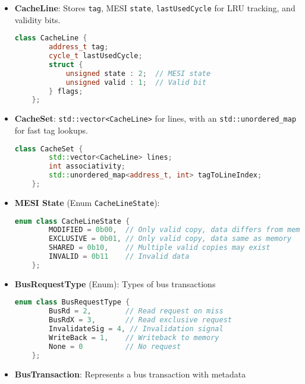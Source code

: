 \documentclass[11pt]{article}
\begin{document}
\begin{itemize}
    \item \textbf{CacheLine}: Stores \texttt{tag}, MESI \texttt{state}, \texttt{lastUsedCycle} for LRU tracking, and validity bits.
    
    \begin{lstlisting}[language=C++]
    class CacheLine {
        address_t tag;
        cycle_t lastUsedCycle;
        struct {
            unsigned state : 2;  // MESI state
            unsigned valid : 1;  // Valid bit
        } flags;
    };
    \end{lstlisting}
    
    \item \textbf{CacheSet}: \texttt{std::vector<CacheLine>} for lines, with an \texttt{std::unordered\_map} for fast tag lookups.
    
    \begin{lstlisting}[language=C++]
    class CacheSet {
        std::vector<CacheLine> lines;
        int associativity;
        std::unordered_map<address_t, int> tagToLineIndex;
    };
    \end{lstlisting}
    
    \item \textbf{MESI State} (Enum \texttt{CacheLineState}): 
    
    \begin{lstlisting}[language=C++]
    enum class CacheLineState { 
        MODIFIED = 0b00,  // Only valid copy, data differs from memory
        EXCLUSIVE = 0b01, // Only valid copy, data same as memory
        SHARED = 0b10,    // Multiple valid copies may exist
        INVALID = 0b11    // Invalid data
    };
    \end{lstlisting}
    
    \item \textbf{BusRequestType} (Enum): Types of bus transactions
    
    \begin{lstlisting}[language=C++]
    enum class BusRequestType { 
        BusRd = 2,        // Read request on miss
        BusRdX = 3,       // Read exclusive request
        InvalidateSig = 4, // Invalidation signal
        WriteBack = 1,    // Writeback to memory
        None = 0          // No request
    };
    \end{lstlisting}
    
    \item \textbf{BusTransaction}: Represents a bus transaction with metadata
    

\end{itemize}
\end{document}
